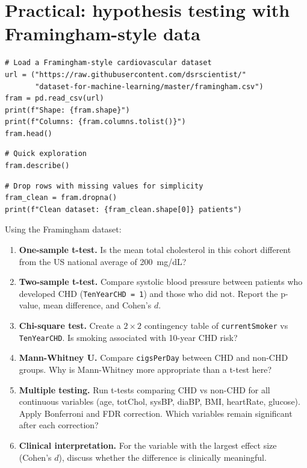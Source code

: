 \section{Practical: hypothesis testing with Framingham-style data}

\begin{verbatim}
# Load a Framingham-style cardiovascular dataset
url = ("https://raw.githubusercontent.com/dsrscientist/"
       "dataset-for-machine-learning/master/framingham.csv")
fram = pd.read_csv(url)
print(f"Shape: {fram.shape}")
print(f"Columns: {fram.columns.tolist()}")
fram.head()
\end{verbatim}

\begin{verbatim}
# Quick exploration
fram.describe()
\end{verbatim}

\begin{verbatim}
# Drop rows with missing values for simplicity
fram_clean = fram.dropna()
print(f"Clean dataset: {fram_clean.shape[0]} patients")
\end{verbatim}

\begin{exercise}
Using the Framingham dataset:
\begin{enumerate}
  \item \textbf{One-sample t-test.} Is the mean total cholesterol in this cohort different from the US national average of 200~mg/dL?
  \item \textbf{Two-sample t-test.} Compare systolic blood pressure between patients who developed CHD (\texttt{TenYearCHD = 1}) and those who did not. Report the p-value, mean difference, and Cohen's $d$.
  \item \textbf{Chi-square test.} Create a $2 \times 2$ contingency table of \texttt{currentSmoker} vs \texttt{TenYearCHD}. Is smoking associated with 10-year CHD risk?
  \item \textbf{Mann-Whitney U.} Compare \texttt{cigsPerDay} between CHD and non-CHD groups. Why is Mann-Whitney more appropriate than a t-test here?
  \item \textbf{Multiple testing.} Run t-tests comparing CHD vs non-CHD for all continuous variables (age, totChol, sysBP, diaBP, BMI, heartRate, glucose). Apply Bonferroni and FDR correction. Which variables remain significant after each correction?
  \item \textbf{Clinical interpretation.} For the variable with the largest effect size (Cohen's $d$), discuss whether the difference is clinically meaningful.
\end{enumerate}
\end{exercise}


